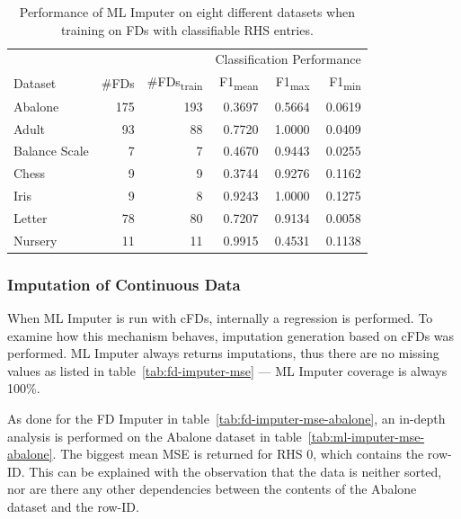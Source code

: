 \begin{table}[ht]
    \centering
    \begin{tabular}{lrrrrr}
        \toprule
        \toprule
        & & & \multicolumn{3}{c}{Classification Performance} \\
        \cmidrule(lr{.25em}){4-6}
        Dataset & \#FDs & \#FDs\textsubscript{train} & F1\textsubscript{mean} & F1\textsubscript{max} & F1\textsubscript{min} \\
        \midrule
        Abalone & 175 & 193 & 0.3697 & 0.5664 & 0.0619 \\
        Adult & 93 & 88 & 0.7720 & 1.0000 & 0.0409 \\
        Balance Scale & 7 & 7 & 0.4670 & 0.9443 & 0.0255 \\
        Chess & 9 & 9 & 0.3744 & 0.9276 & 0.1162 \\
        Iris & 9 & 8 & 0.9243 & 1.0000 & 0.1275 \\
        Letter & 78 & 80 & 0.7207 & 0.9134 & 0.0058 \\
        Nursery & 11 & 11 & 0.9915 & 0.4531 & 0.1138 \\
        \bottomrule
        \bottomrule
    \end{tabular}
    \caption{Performance of ML Imputer on eight different datasets when training on FDs with classifiable RHS entries.}\label{tab:ml-imputer-performance}
\end{table}

\subsubsection{Imputation of Continuous Data}
When ML Imputer is run with cFDs, internally a regression is performed.
To examine how this mechanism behaves, imputation generation based on cFDs was performed.
ML Imputer always returns imputations, thus there are no missing values as listed in table~\ref{tab:fd-imputer-mse} --- ML Imputer coverage is always 100\%.

As done for the FD Imputer in table~\ref{tab:fd-imputer-mse-abalone}, an in-depth analysis is performed on the Abalone dataset in table~\ref{tab:ml-imputer-mse-abalone}.
The biggest mean MSE is returned for RHS 0, which contains the row-ID.
This can be explained with the observation that the data is neither sorted, nor are there any other dependencies between the contents of the Abalone dataset and the row-ID.


